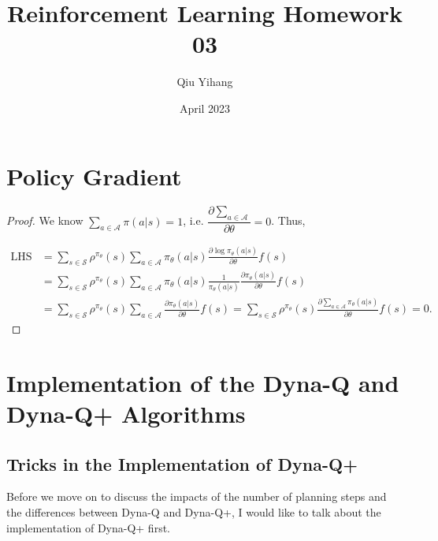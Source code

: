 \documentclass{article}
\title{\textbf{Reinforcement Learning Homework 03}}
\author{Qiu Yihang}
\date{April 2023}
\begin{document}
\maketitle

\vspace{2em}
\section{Policy Gradient}
\vspace{1em}
\begin{proof}
    We know $\sum_{a\in\mathcal{A}}\pi(a|s)=1$, i.e. $\dfrac{\partial\sum_{a\in\mathcal{A}}}{\partial\theta}=0$. Thus,

    \vspace{-2em}
    \begin{align*}
        \mathrm{LHS} &= \sum_{s\in\mathcal{S}}\rho^{\pi_\theta}(s) \sum_{a\in\mathcal{A}} \pi_\theta(a|s)\frac{\partial \log \pi_\theta(a|s)}{\partial \theta} f(s) \\
        & = \sum_{s\in\mathcal{S}}\rho^{\pi_\theta}(s)\sum_{a\in\mathcal{A}}\pi_\theta(a|s) \frac{1}{\pi_\theta(a|s)}\frac{\partial \pi_\theta(a|s)}{\partial\theta}f(s) \\
        & = \sum_{s\in\mathcal{S}}\rho^{\pi_\theta}(s)\sum_{a\in\mathcal{A}}\frac{\partial\pi_\theta(a|s)}{\partial\theta}f(s) = \sum_{s\in\mathcal{S}}\rho^{\pi_\theta}(s)\frac{\partial\sum_{a\in\mathcal{A}}\pi_\theta(a|s)}{\partial\theta}f(s) = 0.
    \end{align*}

    \vspace{-3.7em}
\end{proof}

\vspace{3em}
\section{Implementation of the Dyna-Q and Dyna-Q+ Algorithms}
\vspace{1em}
\setcounter{subsection}{-1}
\subsection{Tricks in the Implementation of Dyna-Q+}
\vspace{1em}

    \hspace{2em}
    Before we move on to discuss the impacts of the number of planning steps and the differences between Dyna-Q and Dyna-Q+, I would like to talk about the implementation of Dyna-Q+ first.
\end{document}
